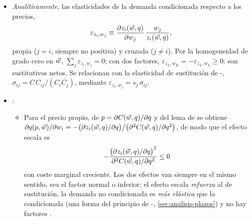 \documentclass[11pt]{article}
\begin{document}
\begin{itemize}
\begin{itemize}
  \item \emph{Sin homoteticidad}: no hace falta; la relación vale para cualquier tecnología, siempre que los rendimientos se midan \emph{localmente} en la combinación que minimiza el coste. Rendimientos locales crecientes en el óptimo equivalen a economías de escala, y decrecientes, a deseconomías.
  \item \emph{Con homoteticidad}: lo que añade es que la senda de expansión es un rayo: crecer por la senda y ampliar todos los factores en la misma proporción son el mismo movimiento, y la relación se cumple a lo largo de toda la senda. Fuera de ese caso, los rendimientos medidos sobre \emph{otro} rayo (por ejemplo, el que pasa por la combinación inicial) pueden diferir de las economías de escala que la empresa aprovecha al cambiar las proporciones.
  \end{itemize}
\item \emph{Analíticamente}, las elasticidades de la demanda condicionada respecto a los precios,
  \begin{equation}
  \varepsilon_{z_i,w_j}\equiv\frac{\partial z_i(\vec{w},q)}{\partial w_j}\,\frac{w_j}{z_i(\vec{w},q)}, \label{eq:elasticidad-factor-w}
  \end{equation}
  propia ($j=i$, siempre no positiva) y cruzada ($j\neq i$). Por la homogeneidad de grado cero en $\vec{w}$, $\sum_j\varepsilon_{z_i,w_j}=0$; con dos factores, $\varepsilon_{z_L,w_K}=-\varepsilon_{z_L,w_L}\geq 0$: son sustitutivos netos. Se relacionan con la elasticidad de sustitución de -, $\sigma_{ij}=C\,C_{ij}/(C_iC_j)$, mediante $\varepsilon_{z_i,w_j}=s_j\,\sigma_{ij}$\nocite{Uzawa1962Production}.
\item {}:
  \begin{itemize}
  \item Para el precio propio, de $p=\partial C(\vec{w},q)/\partial q$ y del lema de  se obtiene $\partial q(p,\vec{w})/\partial w_i=-\big(\partial z_i(\vec{w},q)/\partial q\big)\big/\big(\partial^2C(\vec{w},q)/\partial q^2\big)$, de modo que el efecto escala es
    \begin{equation*}
    -\frac{\big(\partial z_i(\vec{w},q)/\partial q\big)^2}{\partial^2C(\vec{w},q)/\partial q^2}\leq 0
    \end{equation*}
    con coste marginal creciente. Los dos efectos van siempre en el mismo sentido, sea el factor normal o inferior: el efecto escala \emph{refuerza} al de sustitución, la demanda no condicionada es \emph{más elástica} que la condicionada (una forma del principio de -, \ref{sec:analisis-plazos}) y no hay factores \nocite{Varian1992Microeconomic,GravelleRees2004Microeconomics}.
  \end{itemize}
\end{itemize}
\end{document}
